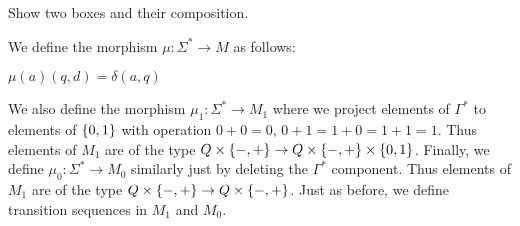\begin{example}
\begin{center}
Show two boxes and their composition.
\end{center}
\end{example}
\begin{definition}
We define the morphism $\mu:\Sigma^*\to M$ as follows:

$\mu(a)(q,d)=\delta(a,q)$

We also define the morphism $\mu_1:\Sigma^*\to M_1$ where we project elements of $\Gamma^*$ to elements of $\{0,1\}$ with operation $0+0=0$, $0+1=1+0=1+1=1$. Thus elements of $M_1$ are of the type $Q\times\{{-},{+}\}\to Q\times\{{-},{+}\}\times \{0,1\}$.
Finally, we define $\mu_0:\Sigma^*\to M_0$ similarly just by deleting the $\Gamma^*$ component.
Thus elements of $M_1$ are of the type $Q\times\{{-},{+}\}\to Q\times\{{-},{+}\}$.
Just as before, we define transition sequences in $M_1$ and $M_0$.
\end{definition}
